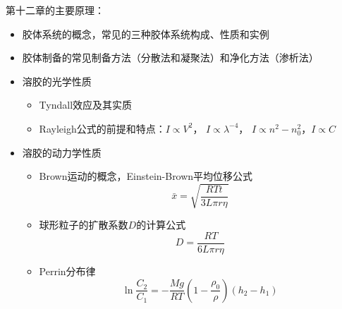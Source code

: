 \documentclass[9pt]{beamer}
\begin{document}
	\begin{frame}
	
	第十二章的主要原理：	
	
	\begin{itemize}
	
	\item 胶体系统的概念，常见的三种胶体系统构成、性质和实例
	
	\item 胶体制备的常见制备方法（分散法和凝聚法）和净化方法（渗析法）
	
	\item 溶胶的光学性质
		\begin{itemize}
	
		\item Tyndall效应及其实质
	
		\item Rayleigh公式的前提和特点：$I \propto V^2$， $I \propto \lambda^{-4}$， $I \propto n^2-n^2_0 $，$I \propto C$
	
		\end{itemize}		
	
	\item 溶胶的动力学性质
		\begin{itemize}
		
		\item Brown运动的概念，Einstein-Brown平均位移公式
		\[
			\bar x = \sqrt{ \frac{ RTt }{ 3L\pi r \eta } }
		\]
		
		\item 球形粒子的扩散系数$D$的计算公式
		\[
			D = \frac{ RT }{ 6L\pi r \eta }
		\]
		
		\item Perrin分布律
		\[
			\ln{ \frac{ C_2 }{ C_1 } } = - \frac{ Mg }{ RT } \left( 1 - \frac{ \rho_0 }{ \rho } \right) ( h_2 - h_1 )
		\]
		
		\end{itemize}
	
	\end{itemize}
	
	\end{frame}
	
\end{document}
